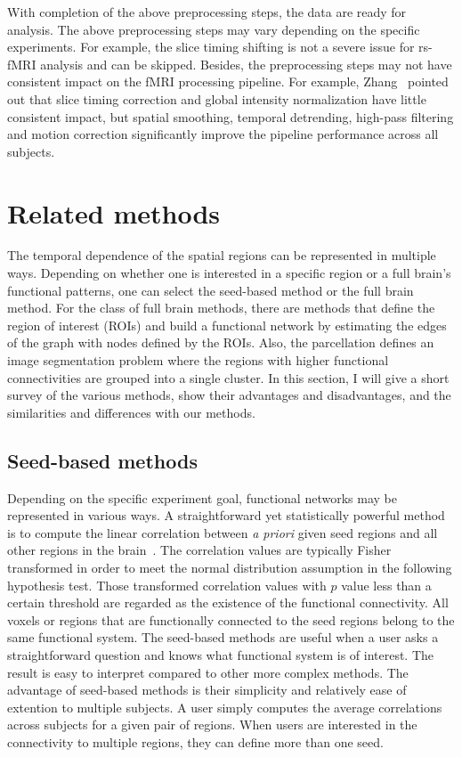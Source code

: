 With completion of the above preprocessing steps, the data are ready for
analysis. The above preprocessing steps may vary depending on the specific
experiments. For example, the slice timing shifting is not a severe issue for
rs-fMRI analysis and can be skipped. Besides, the preprocessing steps may not
have consistent impact on the fMRI processing pipeline. For example,
Zhang~\cite{zhang2009evaluation} pointed out that slice timing correction and
global intensity normalization have little consistent impact, but spatial
smoothing, temporal detrending, high-pass filtering and motion correction
significantly improve the pipeline performance across all subjects.

\section{Related methods}
The temporal dependence of the spatial regions can be represented in multiple
ways. Depending on whether one is interested in a specific region or a full brain's
functional patterns, one can select the  seed-based method or the full brain
method. For the class of full brain methods, there are methods that
define the region of interest (ROIs) and build a functional network by
estimating the edges of the graph with nodes defined by the ROIs. Also, the
parcellation defines an image segmentation problem where the regions with higher
functional connectivities are grouped into a single cluster. In this section, I
will give a short survey of the various methods, show their advantages and
disadvantages, and the similarities and differences with our methods.

\subsection{Seed-based methods}
Depending on the specific experiment goal, functional networks may be
represented in various ways. A straightforward yet statistically powerful method
is to compute the linear correlation between \emph{a priori} given seed regions and
all other regions in the brain~\cite{biswal1995functional, buckner2008brain,
  buckner2009cortical}. The correlation values are typically Fisher transformed
in order to meet the normal distribution assumption in the following hypothesis
test. Those transformed correlation values with $p$ value less than a certain
threshold are regarded as the existence of the functional connectivity. All
voxels or regions that are functionally connected to the seed regions belong to
the same functional system. The seed-based methods are useful when a user asks a
straightforward question and knows what functional system is of interest. The
result is easy to interpret compared to other more complex methods.  The
advantage of seed-based methods is their simplicity and relatively ease of
extention to multiple subjects. A user simply computes the average correlations
across subjects for a given pair of regions. When users are interested in the
connectivity to multiple regions, they can define more than one seed.

